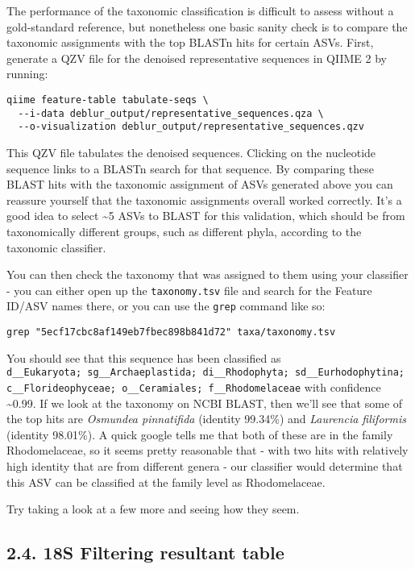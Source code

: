 \documentclass[
]{book}
\begin{document}
The performance of the taxonomic classification is difficult to assess without a gold-standard reference, but nonetheless one basic sanity check is to compare the taxonomic assignments with the top BLASTn hits for certain ASVs. First, generate a QZV file for the denoised representative sequences in QIIME 2 by running:

\begin{verbatim}
qiime feature-table tabulate-seqs \
  --i-data deblur_output/representative_sequences.qza \
  --o-visualization deblur_output/representative_sequences.qzv
\end{verbatim}

This QZV file tabulates the denoised sequences. Clicking on the nucleotide sequence links to a BLASTn search for that sequence. By comparing these BLAST hits with the taxonomic assignment of ASVs generated above you can reassure yourself that the taxonomic assignments overall worked correctly. It's a good idea to select \textasciitilde5 ASVs to BLAST for this validation, which should be from taxonomically different groups, such as different phyla, according to the taxonomic classifier.

You can then check the taxonomy that was assigned to them using your classifier - you can either open up the \texttt{taxonomy.tsv} file and search for the Feature ID/ASV names there, or you can use the \texttt{grep} command like so:

\begin{verbatim}
grep "5ecf17cbc8af149eb7fbec898b841d72" taxa/taxonomy.tsv
\end{verbatim}

You should see that this sequence has been classified as \texttt{d\_\_Eukaryota;\ sg\_\_Archaeplastida;\ di\_\_Rhodophyta;\ sd\_\_Eurhodophytina;\ c\_\_Florideophyceae;\ o\_\_Ceramiales;\ f\_\_Rhodomelaceae} with confidence \textasciitilde0.99. If we look at the taxonomy on NCBI BLAST, then we'll see that some of the top hits are \emph{Osmundea pinnatifida} (identity 99.34\%) and \emph{Laurencia filiformis} (identity 98.01\%). A quick google tells me that both of these are in the family Rhodomelaceae, so it seems pretty reasonable that - with two hits with relatively high identity that are from different genera - our classifier would determine that this ASV can be classified at the family level as Rhodomelaceae.

Try taking a look at a few more and seeing how they seem.

\subsection{2.4. 18S Filtering resultant table}\label{s-filtering-resultant-table-1}
\end{document}
